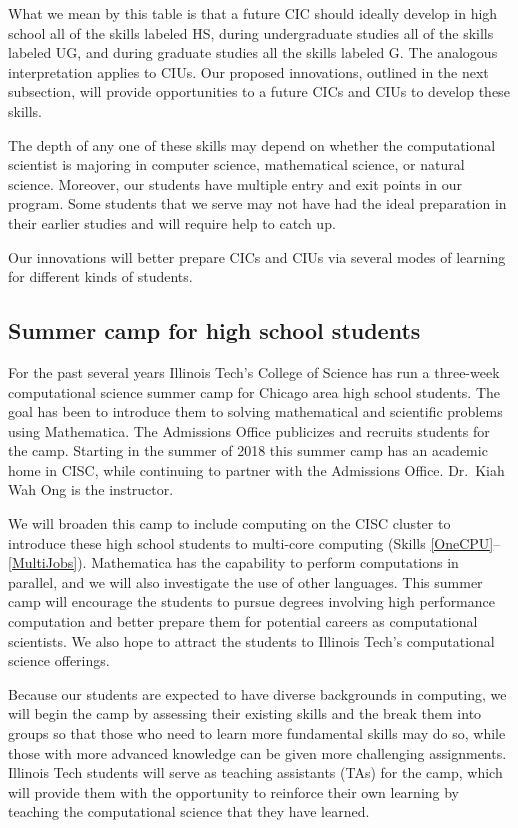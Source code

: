 \documentclass[11pt]{NSFamsart}
\begin{document}
What we mean by this table is that a future CIC should ideally develop in high school all of the skills labeled HS, during undergraduate studies  all of the skills labeled UG, and during graduate studies all the skills labeled G.  The analogous interpretation applies to CIUs.  Our proposed innovations, outlined in the next subsection, will provide opportunities to a future CICs and CIUs to develop these skills.  

The depth of any one of these skills may depend on whether the computational scientist is majoring in computer science, mathematical science, or natural science.  Moreover, our students have multiple entry and exit points in our program.  Some students that we serve may not have had the ideal preparation in their earlier studies and will require help to catch up.


Our innovations will better prepare CICs and CIUs via several modes of learning for different kinds of students.

\subsection{Summer camp for high school students} \label{Camp} For the past several years Illinois Tech's College of Science has run a three-week computational science summer camp for Chicago area high school students.  The goal has been to introduce them to solving mathematical and scientific problems using Mathematica.  The Admissions Office publicizes and recruits students for the camp.  Starting in the summer of 2018 this summer camp has an academic home in CISC, while continuing to partner with the Admissions Office.  Dr.\ Kiah Wah Ong is the instructor.

We will broaden this camp to include computing on the CISC cluster to introduce these high school students to multi-core computing (Skills \ref{OneCPU}--\ref{MultiJobs}).  Mathematica has the capability to perform computations in parallel, and we will also investigate the use of other languages.  This summer camp will encourage the students to pursue degrees involving high performance computation and better prepare them for potential careers as computational scientists.  We also hope to attract the students to Illinois Tech's computational science offerings.  

Because our students are expected to have diverse backgrounds in computing, we will begin the camp by assessing their existing skills and the break them into groups so that those who need to learn more fundamental skills may do so, while those with more advanced knowledge can be given more challenging assignments.  Illinois Tech students will serve as teaching assistants (TAs) for the camp, which will provide them with the opportunity to reinforce their own learning by teaching the computational science that they have learned. 
\end{document}
